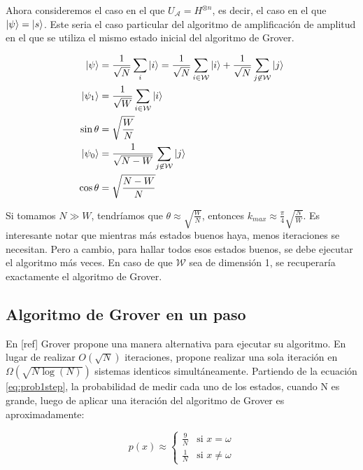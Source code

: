 Ahora consideremos el caso en el que $U_\mathcal{A} = H^{\otimes n}$, es decir, el caso en el que $\ket{\psi} = \ket{s}$. Este seria el caso particular del algoritmo de amplificación de amplitud en el que se utiliza el mismo estado inicial del algoritmo de Grover.

\begin{align}
    \ket{\psi} &= \frac{1}{\sqrt{N}} \sum\limits_i \ket{i} = \frac{1}{\sqrt{N}} \sum\limits_{i \in \mathcal{W}} \ket{i} + \frac{1}{\sqrt{N}} \sum\limits_{j \not\in \mathcal{W}} \ket{j} \\
    \ket{\psi_1} &= \frac{1}{\sqrt{W}} \sum\limits_{i \in \mathcal{W}} \ket{i} \\
    \sin{\theta} &= \sqrt{\frac{W}{N}} \\
    \ket{\psi_0} &= \frac{1}{\sqrt{N-W}} \sum\limits_{j \not\in \mathcal{W}} \ket{j} \\
    \cos{\theta} &= \sqrt{\frac{N-W}{N}}
\end{align}

Si tomamos $N \gg W$, tendríamos que $\theta \approx \sqrt{\frac{W}{N}}$, entonces $k_{max} \approx \frac{\pi}{4} \sqrt{\frac{N}{W}}$. Es interesante notar que mientras más estados buenos haya, menos iteraciones se necesitan. Pero a cambio, para hallar todos esos estados buenos, se debe ejecutar el algoritmo más veces. En caso de que $\mathcal{W}$ sea de dimensión 1, se recuperaría exactamente el algoritmo de Grover.

\subsection{Algoritmo de Grover en un paso}

En [ref] Grover propone una manera alternativa para ejecutar su algoritmo. En lugar de realizar $O(\sqrt{N})$ iteraciones, propone realizar una sola iteración en $\Omega(\sqrt{N \log(N)})$ sistemas identicos simultáneamente. Partiendo de la ecuación \ref{eq:prob1step}, la probabilidad de medir cada uno de los estados, cuando N es grande, luego de aplicar una iteración del algoritmo de Grover es aproximadamente:

\begin{equation}
    p(x) \approx
    \begin{cases}
        \frac{9}{N} & \text{si } x = \omega \\
        \frac{1}{N} & \text{si } x \neq \omega
    \end{cases}
\end{equation}

